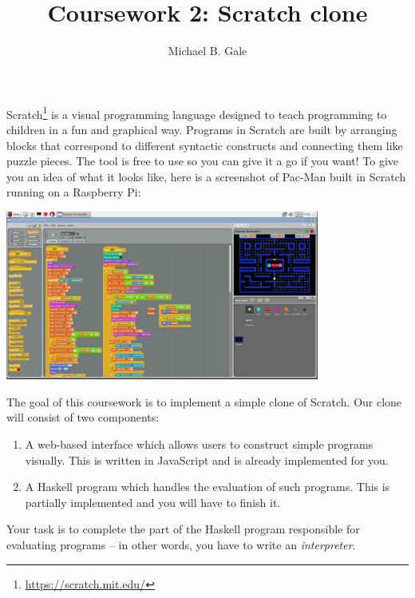 \documentclass{cs256-shared/cs256}
\author{Michael B. Gale}
\title{Coursework 2: Scratch clone}
\begin{document}
\makeheader

Scratch\footnote{\url{https://scratch.mit.edu/}} is a visual programming language designed to teach programming to children in a fun and graphical way. Programs in Scratch are built by arranging blocks that correspond to different syntactic constructs and connecting them like puzzle pieces. The tool is free to use so you can give it a go if you want! To give you an idea of what it looks like, here is a screenshot of Pac-Man built in Scratch running on a Raspberry Pi:

\begin{center}
\includegraphics[width=390px]{scratch_rpi.png}
\end{center}

The goal of this coursework is to implement a simple clone of Scratch. Our clone will consist of two components:
\begin{enumerate}
    \item A web-based interface which allows users to construct simple programs visually. This is written in JavaScript and is already implemented for you.
    \item A Haskell program which handles the evaluation of such programs. This is partially implemented and you will have to finish it.
\end{enumerate}
Your task is to complete the part of the Haskell program responsible for evaluating programs -- in other words, you have to write an \emph{interpreter}.
\end{document}
